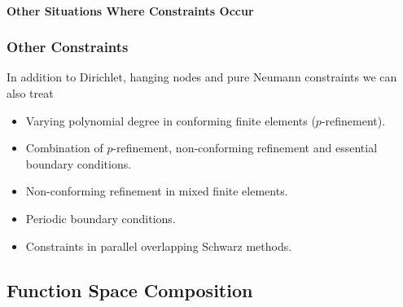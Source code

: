 \paragraph{Other Situations Where Constraints Occur}

\begin{frame}
\frametitle<presentation>{Other Constraints}
In addition to Dirichlet, hanging nodes and pure Neumann constraints we can also treat
\begin{itemize}
\item Varying polynomial degree in conforming finite elements
($p$-refinement).
\item Combination of $p$-refinement, non-conforming refinement and essential
boundary conditions.
\item Non-conforming refinement in mixed finite elements.
\item Periodic boundary conditions.
\item Constraints in parallel overlapping Schwarz methods.
\end{itemize}
\end{frame}


\subsection{Function Space Composition}

